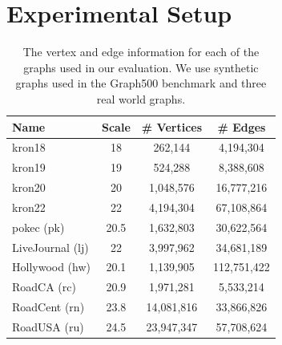 %


\section{Experimental Setup}

\begin{table}[]
    \centering
    \begin{footnotesize}
    \begin{tabular}{lccc}
    \toprule
     \textbf{Name} & \textbf{Scale} & \textbf{\# Vertices} & \textbf{\# Edges} \\ \midrule %
     kron18 & 18 & 262,144 & 4,194,304 \\ %
     kron19 & 19 & 524,288 & 8,388,608 \\
     kron20 & 20 & 1,048,576 & 16,777,216 \\ %
     kron22 & 22 & 4,194,304 & 67,108,864 \\ %
     pokec (pk) & 20.5 & 1,632,803 & 30,622,564 \\ %
     LiveJournal (lj) & 22 & 3,997,962 & 34,681,189 \\ %
     Hollywood (hw)& 20.1 & 1,139,905 & 112,751,422 \\
     RoadCA (rc)& 20.9 & 1,971,281 & 5,533,214 \\
     RoadCent (rn)& 23.8 & 14,081,816 & 33,866,826 \\
     RoadUSA (ru)& 24.5 & 23,947,347 & 57,708,624\\
     \bottomrule
    \end{tabular}
    \end{footnotesize}
    \caption{The vertex and edge information for each of the graphs used in our evaluation. We use synthetic \kron graphs used in the Graph500 benchmark and three real world graphs.}
    \label{sec:eval:tab:graphs}
\end{table}

